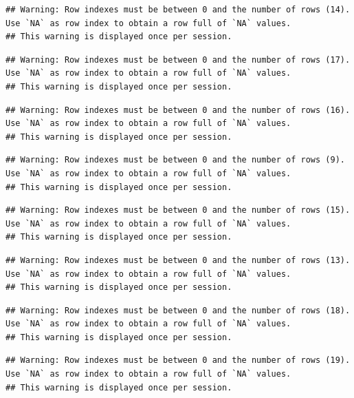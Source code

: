 \documentclass[]{book}
\begin{document}
\begin{verbatim}
## Warning: Row indexes must be between 0 and the number of rows (14). Use `NA` as row index to obtain a row full of `NA` values.
## This warning is displayed once per session.
\end{verbatim}

\begin{verbatim}
## Warning: Row indexes must be between 0 and the number of rows (17). Use `NA` as row index to obtain a row full of `NA` values.
## This warning is displayed once per session.
\end{verbatim}

\begin{verbatim}
## Warning: Row indexes must be between 0 and the number of rows (16). Use `NA` as row index to obtain a row full of `NA` values.
## This warning is displayed once per session.
\end{verbatim}

\begin{verbatim}
## Warning: Row indexes must be between 0 and the number of rows (9). Use `NA` as row index to obtain a row full of `NA` values.
## This warning is displayed once per session.
\end{verbatim}

\begin{verbatim}
## Warning: Row indexes must be between 0 and the number of rows (15). Use `NA` as row index to obtain a row full of `NA` values.
## This warning is displayed once per session.
\end{verbatim}

\begin{verbatim}
## Warning: Row indexes must be between 0 and the number of rows (13). Use `NA` as row index to obtain a row full of `NA` values.
## This warning is displayed once per session.
\end{verbatim}

\begin{verbatim}
## Warning: Row indexes must be between 0 and the number of rows (18). Use `NA` as row index to obtain a row full of `NA` values.
## This warning is displayed once per session.
\end{verbatim}

\begin{verbatim}
## Warning: Row indexes must be between 0 and the number of rows (19). Use `NA` as row index to obtain a row full of `NA` values.
## This warning is displayed once per session.
\end{verbatim}
\end{document}
